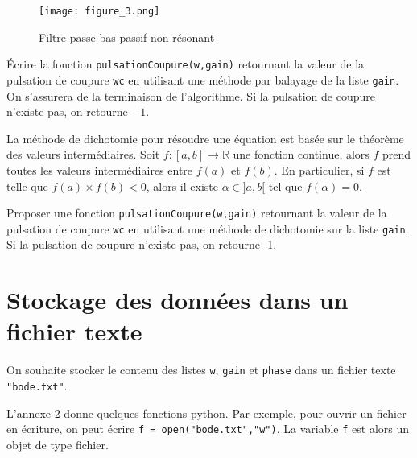 \begin{figure}[!h]
\begin{center}
\texttt{[image: figure\_3.png]} 
\caption{\label{Fig3} Filtre passe-bas passif non résonant}
\end{center}
\end{figure}

 
\question{} Écrire la fonction \texttt{pulsationCoupure(w,gain)} retournant la valeur de la pulsation de coupure \texttt{wc} en utilisant une méthode par balayage de la liste \texttt{gain}. On s'assurera de la terminaison de l'algorithme. Si la pulsation de coupure n'existe pas, on retourne $-1$.
 

\begin{dBox}
La méthode de dichotomie pour résoudre une équation est basée sur le théorème des valeurs intermédiaires. Soit $f : [a,b] \to \mathbb{R}$ une fonction continue, alors $f$ prend toutes les valeurs intermédiaires entre $f(a)$ et $f(b)$.
En particulier, si $f$ est telle que $f(a) \times f(b)<0$, alors il existe $\alpha \in ]a,b[$ tel que $f(\alpha) = 0$.
\end{dBox}

  
\question{} Proposer une fonction \texttt{pulsationCoupure(w,gain)} retournant la valeur de la pulsation de coupure \texttt{wc} en utilisant une méthode de dichotomie sur la liste \texttt{gain}. Si la pulsation de coupure n'existe pas, on retourne -1.
 


%  
% 


 \section*{Stockage des données dans un fichier texte}

On souhaite stocker le contenu des listes \texttt{w}, \texttt{gain} et \texttt{phase} dans un fichier texte \texttt{"bode.txt"}.

L'annexe 2 donne quelques fonctions python.
Par exemple, pour ouvrir un fichier en écriture, on peut écrire \texttt{f = open("bode.txt","w")}. La variable \texttt{f} est alors un objet de type fichier.

